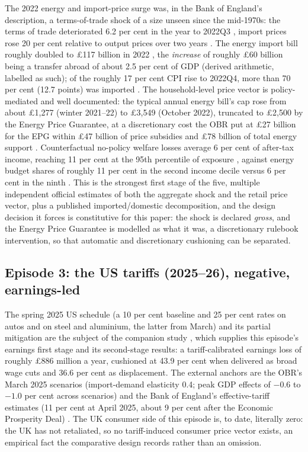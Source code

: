 The 2022 energy and import-price surge was, in the Bank of England's
description, a terms-of-trade shock of a size unseen since the
mid-1970s: the terms of trade deteriorated 6.2 per cent in the year to
2022Q3 \citep{onstot2023}, import prices rose 20 per cent relative to
output prices over two years \citep{broadbent2022}. The energy import
bill roughly doubled to \pounds 117 billion in 2022 \citep{imf2023},
the \emph{increase} of roughly \pounds 60 billion being a transfer
abroad of about 2.5 per cent of GDP (derived arithmetic, labelled as
such); of the roughly 17 per cent CPI rise to 2022Q4, more than 70 per
cent (12.7 points) was imported \citep{dhingrapage2023}. The
household-level price vector is policy-mediated and well documented:
the typical annual energy bill's cap rose from about \pounds 1,277
(winter 2021--22) to \pounds 3,549 (October 2022), truncated to
\pounds 2,500 by the Energy Price Guarantee, at a discretionary cost
the OBR put at \pounds 27 billion for the EPG within \pounds 47
billion of price subsidies and \pounds 78 billion of total energy
support \citep{obrenergy2022}. Counterfactual no-policy welfare losses
average 6 per cent of after-tax income, reaching 11 per cent at the
95th percentile of exposure \citep{levell2025}, against energy budget
shares of roughly 11 per cent in the second income decile versus 6 per
cent in the ninth \citep{rf2022}. This is the strongest first stage of
the five, multiple independent official estimates of both the
aggregate shock and the retail price vector, plus a published
imported/domestic decomposition, and the design decision it forces is
constitutive for this paper: the shock is declared \emph{gross}, and
the Energy Price Guarantee is modelled as what it was, a discretionary
rulebook intervention, so that automatic and discretionary cushioning
can be separated.

\subsection{Episode 3: the US tariffs (2025--26), negative, earnings-led}

The spring 2025 US schedule (a 10 per cent baseline and 25 per cent
rates on autos and on steel and aluminium, the latter from March) and its partial mitigation are the subject of the companion
study \citep{ahmadi2026}, which supplies this episode's earnings first
stage and its second-stage results: a tariff-calibrated earnings loss of
roughly \pounds 886 million a year, cushioned at 43.9 per cent when
delivered as broad wage cuts and 36.6 per cent as displacement. The
external anchors are the OBR's March 2025 scenarios (import-demand
elasticity 0.4; peak GDP effects of $-0.6$ to $-1.0$ per cent across
scenarios) \citep{obr2025} and the Bank of England's effective-tariff
estimates (11 per cent at April 2025, about 9 per cent after the
Economic Prosperity Deal) \citep{boempr2025}. The UK consumer side of
this episode is, to date, literally zero: the UK has not retaliated, so
no tariff-induced consumer price vector exists, an empirical fact the
comparative design records rather than an omission.

